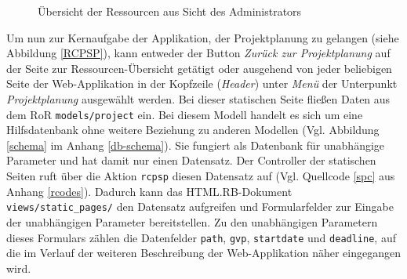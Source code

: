 \documentclass[a4paper,12pt,parskip,bibtotoc,liststotoc]{article}
\begin{document}
\begin{figure}[h!]
  \begin{center}
    \caption{Übersicht der Ressourcen aus Sicht des Administrators}  \label{ResAd}
  \end{center}
\end{figure}     
  
Um nun zur Kernaufgabe der Applikation, der Projektplanung zu gelangen (siehe Abbildung \ref{RCPSP}), kann entweder der Button \textit{Zurück zur Projektplanung} auf der Seite zur Ressourcen-Übersicht getätigt oder ausgehend von jeder beliebigen Seite der Web-Applikation in der Kopfzeile (\textit{Header}) unter \textit{Menü} der Unterpunkt \textit{Projektplanung} ausgewählt werden. Bei dieser statischen Seite fließen Daten aus dem RoR \texttt{models/project} ein. Bei diesem Modell handelt es sich um eine Hilfsdatenbank ohne weitere Beziehung zu anderen Modellen (Vgl. Abbildung \ref{schema} im Anhang \ref{db-schema}). Sie fungiert als Datenbank für unabhängige Parameter und hat damit nur einen Datensatz. Der Controller der statischen Seiten ruft über die Aktion \texttt{rcpsp} diesen Datensatz auf (Vgl. Quellcode \ref{spc} aus Anhang \ref{rcodes}). Dadurch kann das HTML.RB-Dokument \texttt{views/static\_pages/} den Datensatz aufgreifen und Formularfelder zur Eingabe der unabhängigen Parameter bereitstellen. Zu den unabhängigen Parametern dieses Formulars zählen die Datenfelder \texttt{path}, \texttt{gvp}, \texttt{startdate} und \texttt{deadline}, auf die im Verlauf der weiteren Beschreibung der Web-Applikation näher eingegangen wird.\\ %
\end{document}
